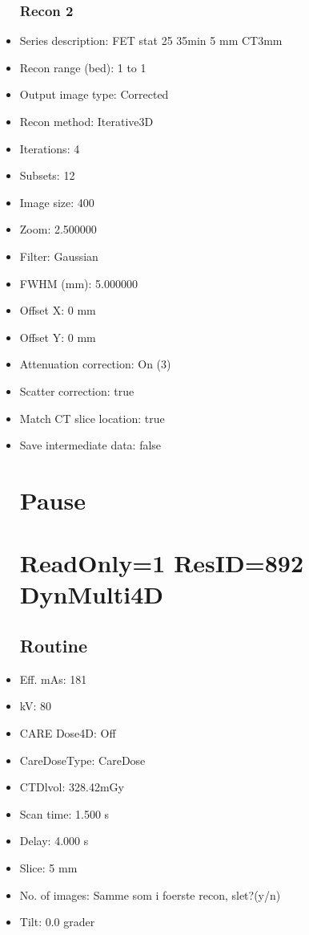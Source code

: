 \documentclass[12pt]{article}
\begin{document}
\begin{itemize}
\subsubsection{Recon 2}
\item Series description: FET stat 25 35min 5 mm CT3mm
\item Recon range (bed): 1 to 1
\item Output image type: Corrected
\item Recon method: Iterative3D
\item Iterations: 4
\item Subsets: 12
\item Image size: 400
\item Zoom: 2.500000
\item Filter: Gaussian
\item FWHM (mm): 5.000000
\item Offset X: 0 mm
\item Offset Y: 0 mm
\item Attenuation correction: On (3)
\item Scatter correction: true
\item Match CT slice location: true
\item Save intermediate data: false
\section{Pause}

\section{ReadOnly=1 ResID=892 DynMulti4D}
\subsection{Routine}
\item Eff. mAs: 181\item kV: 80\item CARE Dose4D: Off\item CareDoseType: CareDose\item CTDlvol: 328.42mGy\item Scan time: 1.500 s\item Delay: 4.000 s\item Slice: 5 mm\item No. of images: Samme som i foerste recon, slet?(y/n)\item Tilt: 0.0 grader

\end{itemize}
\end{document}
